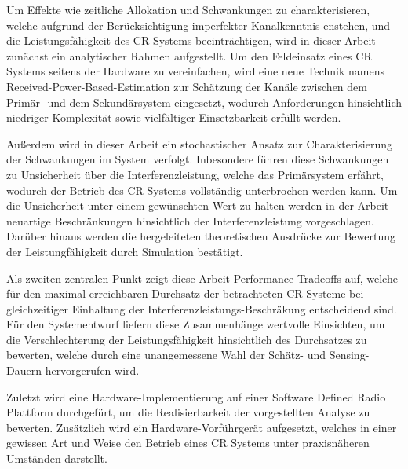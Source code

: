 Um Effekte wie zeitliche Allokation und Schwankungen zu charakterisieren, welche aufgrund der Ber\"ucksichtigung imperfekter Kanalkenntnis enstehen, und die Leistungsf\"ahigkeit des CR Systems beeintr\"achtigen, wird in dieser Arbeit zun\"achst ein analytischer Rahmen aufgestellt. Um den Feldeinsatz eines CR Systems seitens der Hardware zu vereinfachen, wird eine neue Technik namens Received-Power-Based-Estimation zur Sch\"atzung der Kan\"ale  zwischen dem Prim\"ar- und dem Sekund\"arsystem eingesetzt, wodurch Anforderungen hinsichtlich niedriger Komplexit\"at sowie vielf\"altiger Einsetzbarkeit erf\"ullt werden. 

Au\ss erdem wird in dieser Arbeit ein stochastischer Ansatz zur Charakterisierung der Schwankungen im System verfolgt. Inbesondere f\"uhren diese Schwankungen zu Unsicherheit \"uber die Interferenzleistung, welche das Prim\"arsystem erf\"ahrt, wodurch der Betrieb des CR Systems vollst\"andig unterbrochen werden kann. Um die Unsicherheit unter einem gew\"unschten Wert zu halten werden in der Arbeit neuartige Beschr\"ankungen hinsichtlich der Interferenzleistung vorgeschlagen. Dar\"uber hinaus werden die hergeleiteten theoretischen Ausdr\"ucke zur Bewertung der Leistungf\"ahigkeit durch Simulation best\"atigt. 

Als zweiten zentralen Punkt zeigt diese Arbeit Performance-Tradeoffs auf, welche f\"ur den maximal erreichbaren Durchsatz der betrachteten CR Systeme bei gleichzeitiger Einhaltung der Interferenzleistungs-Beschr\"akung entscheidend sind. F\"ur den Systementwurf liefern diese Zusammenh\"ange wertvolle Einsichten, um die Verschlechterung der Leistungsf\"ahigkeit hinsichtlich des Durchsatzes zu bewerten, welche durch eine unangemessene Wahl der Sch\"atz- und Sensing-Dauern hervorgerufen wird.

Zuletzt wird eine Hardware-Implementierung auf einer Software Defined Radio Plattform durchgef\"urt, um die Realisierbarkeit der vorgestellten Analyse zu bewerten. Zus\"atzlich wird ein Hardware-Vorf\"uhrger\"at aufgesetzt, welches in einer gewissen Art und Weise den Betrieb eines CR Systems unter praxisn\"aheren Umst\"anden darstellt.

\cleardoublepage
